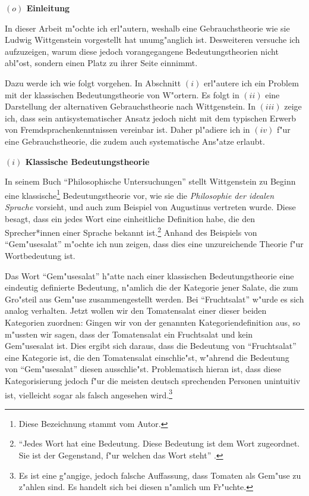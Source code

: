 \documentclass[a4paper, emulatestandardclasses, 12pt]{scrartcl}
\begin{document}
\begin{onehalfspace} 

\noindent\textbf{$(o)$ Einleitung}

\noindent In dieser Arbeit m"ochte ich erl"autern, weshalb eine Gebrauchstheorie wie sie Ludwig Wittgenstein vorgestellt hat unumg"anglich ist. Desweiteren versuche ich aufzuzeigen, warum diese jedoch vorangegangene Bedeutungstheorien nicht abl"ost, sondern einen Platz zu ihrer Seite einnimmt. 

Dazu werde ich wie folgt vorgehen. In Abschnitt $(i)$ erl"autere ich ein Problem mit der klassischen Bedeutungstheorie von W"ortern. Es folgt in $(ii)$ eine Darstellung der alternativen Gebrauchstheorie nach Wittgenstein. In $(iii)$ zeige ich, dass sein antisystematischer Ansatz jedoch nicht mit dem typischen Erwerb von Fremdsprachenkenntnissen vereinbar ist. Daher pl"adiere ich in $(iv)$ f"ur eine Gebrauchstheorie, die zudem auch systematische Ans"atze erlaubt. 
\vspace{5mm}

\noindent\textbf{$(i)$ Klassische Bedeutungstheorie}

\noindent In seinem Buch "`Philosophische Untersuchungen"' \citep{wittgenstein1963tractatus} stellt Wittgenstein zu Beginn eine klassische\footnote{Diese Bezeichnung stammt vom Autor.} Bedeutungstheorie vor, wie sie die \emph{Philosophie der idealen Sprache} vorsieht, und auch zum Beispiel von Augustinus vertreten wurde. Diese besagt, dass ein jedes Wort eine einheitliche Definition habe, die den Sprecher*innen einer Sprache bekannt ist.\footnote{"`Jedes Wort hat eine Bedeutung. Diese Bedeutung ist dem Wort zugeordnet. Sie ist der Gegenstand, f"ur welchen das Wort steht"' \citep[PU \S 1]{wittgenstein1963tractatus}.} Anhand des Beispiels von "`Gem"usesalat"' m"ochte ich nun zeigen, dass dies eine unzureichende Theorie f"ur Wortbedeutung ist.

Das Wort "`Gem"usesalat"' h"atte nach einer klassischen Bedeutungstheorie eine eindeutig definierte Bedeutung, n"amlich die der Kategorie jener Salate, die zum Gro"steil aus Gem"use zusammengestellt werden. Bei "`Fruchtsalat"' w"urde es sich analog verhalten. Jetzt wollen wir den Tomatensalat einer dieser beiden Kategorien zuordnen: Gingen wir von der genannten Kategoriendefinition aus, so m"ussten wir sagen, dass der Tomatensalat ein Fruchtsalat und kein Gem"usesalat ist. Dies ergibt sich daraus, dass die Bedeutung von "`Fruchtsalat"' eine Kategorie ist, die den Tomatensalat einschlie"st, w"ahrend die Bedeutung von "`Gem"usesalat"' diesen ausschlie"st. Problematisch hieran ist, dass diese Kategorisierung jedoch f"ur die meisten deutsch sprechenden Personen unintuitiv ist, vielleicht sogar als falsch angesehen wird.\footnote{Es ist eine g"angige, jedoch falsche Auffassung, dass Tomaten als Gem"use zu z"ahlen sind. Es handelt sich bei diesen n"amlich um Fr"uchte.} 


\end{onehalfspace}
\end{document}
